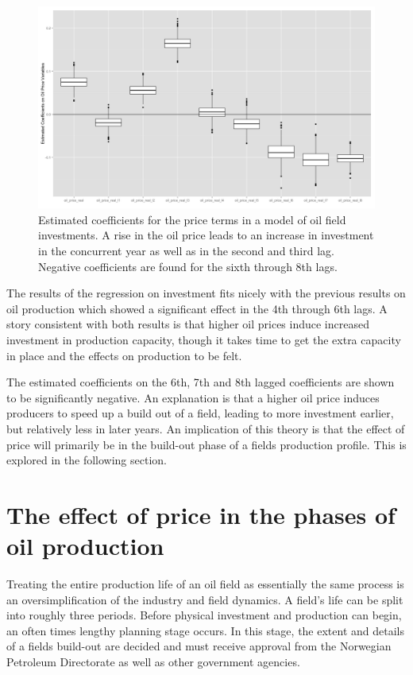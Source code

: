 \documentclass[12pt]{article}
\begin{document}
\begin{figure}
	\includegraphics[width=1\textwidth]{figures/invest_pooled_print.png}
	\caption{Estimated coefficients for the price terms in a model of oil field investments.  A rise in the oil price leads to an increase in investment in the concurrent year as well as in the second and third lag. Negative coefficients are found for the sixth through 8th lags.}
	\label{gam_price_invest_box}
\end{figure}

The results of the regression on investment fits nicely with the previous results on oil production which showed a significant effect in the 4th through 6th lags.  A story consistent with both results is that higher oil prices induce increased investment in production capacity, though it takes time to get the extra capacity in place and the effects on production to be felt.

The estimated coefficients on the 6th, 7th and 8th lagged coefficients are shown to be significantly negative. An explanation is that a higher oil price induces producers to speed up a build out of a field, leading to more investment earlier, but relatively less in later years.  An implication of this theory is that the effect of price will primarily be in the build-out phase of a fields production profile.  This is explored in the following section.

\section{The effect of price in the phases of oil production}

Treating the entire production life of an oil field as essentially the same process is an oversimplification of the industry and field dynamics.  A field's life can be split into roughly three periods.  Before physical investment and production can begin, an often times lengthy planning stage occurs.  In this stage, the extent and details of a fields build-out are decided and must receive approval from the Norwegian Petroleum Directorate as well as other government agencies.  
\end{document}
